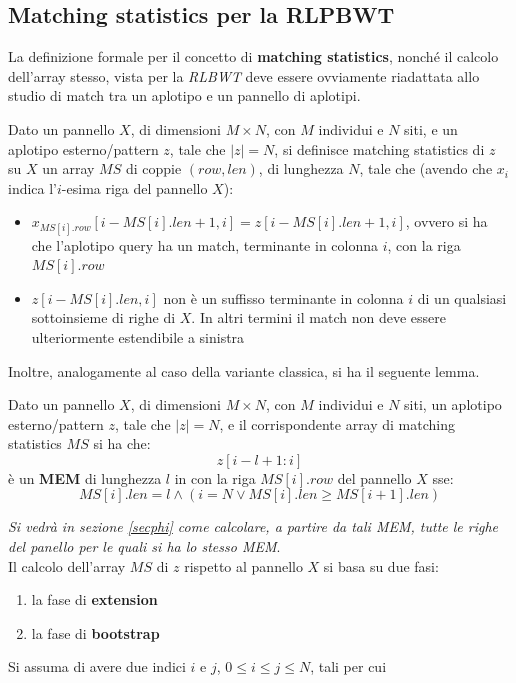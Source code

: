 \subsection{Matching statistics per la RLPBWT}
La definizione formale per il concetto di \textbf{matching statistics}, nonché
il calcolo dell'array stesso, vista per
la \textit{RLBWT} deve essere ovviamente riadattata allo studio di match tra un
aplotipo e un pannello di aplotipi.
\begin{definizione}
  Dato un pannello $X$, di dimensioni $M\times N$, con $M$ individui e $N$ siti,
  e un aplotipo esterno/pattern $z$, tale che $|z|=N$, si definisce matching
  statistics di $z$ su $X$ un array $MS$ di coppie $(row,len)$, di lunghezza
  $N$, tale che (avendo che $x_i$ indica l'$i$-esima riga del pannello $X$): 
  \begin{itemize}
    \item $x_{MS[i].row}[i-MS[i].len+1,i]=z[i-MS[i].len+1,i]$, ovvero si ha che
    l'aplotipo query ha un match, terminante in colonna $i$, con la riga
    $MS[i].row$  
    \item $z[i-MS[i].len,i]$ non è un suffisso terminante in colonna $i$ di un
    qualsiasi sottoinsieme di righe di $X$. In altri termini il match non deve
    essere ulteriormente estendibile a sinistra
  \end{itemize}
\end{definizione}
Inoltre, analogamente al caso della variante classica, si ha il seguente lemma.
\begin{lemma}
  Dato un pannello $X$, di dimensioni $M\times N$, con $M$ individui e $N$
  siti, un aplotipo esterno/pattern $z$, tale che $|z|=N$, e il corrispondente
  array di matching statistics $MS$ si ha che:
  \[z[i-l+1:i]\]
  è un \textbf{MEM} di lunghezza $l$ in con la riga $MS[i].row$ del pannello
  $X$ sse: 
  \[MS[i].len=l\land(i=N\lor MS[i].len\geq MS[i+1].len)\]
\end{lemma}
\textit{Si vedrà in sezione \ref{secphi} come calcolare, a partire da tali
  \emph{MEM}, tutte le righe del panello per le quali si ha lo stesso
  \textup{MEM}}.\\
Il calcolo dell'array $MS$ di $z$ rispetto al pannello $X$ si basa su due fasi:
\begin{enumerate}
  \item la fase di \textbf{extension}
  \item la fase di \textbf{bootstrap}
\end{enumerate}
Si assuma di avere due indici $i$ e $j$, $0\leq i\leq j\leq N$, tali per cui
